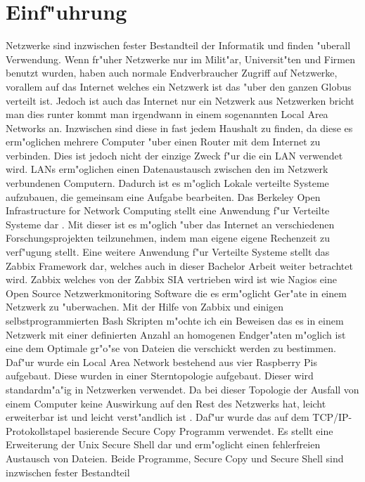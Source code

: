 \chapter{Einf"uhrung}
\label{cha:einfuehrung}

Netzwerke sind inzwischen fester Bestandteil der Informatik und finden "uberall Verwendung. %
Wenn fr"uher Netzwerke nur im Milit"ar, Universit"ten und Firmen benutzt wurden, haben auch %
normale Endverbraucher Zugriff auf Netzwerke, vorallem auf das Internet welches ein Netzwerk ist %
das "uber den ganzen Globus verteilt ist. Jedoch ist auch das Internet nur ein Netzwerk aus Netzwerken %
bricht man dies runter kommt man irgendwann in einem sogenannten Local Area Networks an. Inzwischen sind diese in fast jedem %
Haushalt zu finden, da diese es erm"oglichen mehrere Computer "uber einen Router mit dem Internet %
zu verbinden. Dies ist jedoch nicht der einzige Zweck f"ur die ein LAN verwendet wird. %
LANs erm"oglichen einen Datenaustausch zwischen den im Netzwerk verbundenen Computern. %
Dadurch ist es m"oglich Lokale verteilte Systeme aufzubauen, die gemeinsam eine Aufgabe %
bearbeiten. Das Berkeley Open Infrastructure for Network Computing stellt eine Anwendung %
f"ur Verteilte Systeme dar \autocite{uni:boinc}. Mit dieser ist es m"oglich "uber das %
Internet an verschiedenen Forschungsprojekten teilzunehmen, indem man eigene eigene %
Rechenzeit zu verf"ugung stellt. Eine weitere Anwendung f"ur Verteilte Systeme stellt %
das Zabbix Framework dar, welches auch in dieser Bachelor Arbeit weiter betrachtet wird. %
Zabbix welches von der Zabbix SIA vertrieben wird ist wie Nagios eine Open Source %
Netzwerkmonitoring Software die es erm"oglicht Ger"ate in einem Netzwerk zu "uberwachen. %
Mit der Hilfe von Zabbix und einigen selbstprogrammierten Bash Skripten m"ochte ich ein %
Beweisen das es in einem Netzwerk mit einer definierten Anzahl an homogenen Endger"aten %
m"oglich ist eine dem Optimale gr"o"se von Dateien die verschickt werden zu bestimmen. %
Daf"ur wurde ein Local Area Network bestehend aus vier Raspberry Pis aufgebaut. Diese wurden %
in einer Sterntopologie aufgebaut. Dieser wird standardm"a"ig in %
Netzwerken verwendet. Da bei dieser Topologie der Ausfall von einem Computer keine Auswirkung %
auf den Rest des Netzwerks hat, leicht erweiterbar ist und leicht verst"andlich ist \autocite{book:CN2003}. %
Daf"ur wurde das auf dem TCP/IP-Protokollstapel basierende Secure Copy Programm verwendet. %
Es stellt eine Erweiterung der Unix Secure Shell dar und erm"oglicht einen fehlerfreien %
Austausch von Dateien. Beide Programme, Secure Copy und Secure Shell sind inzwischen fester Bestandteil %
